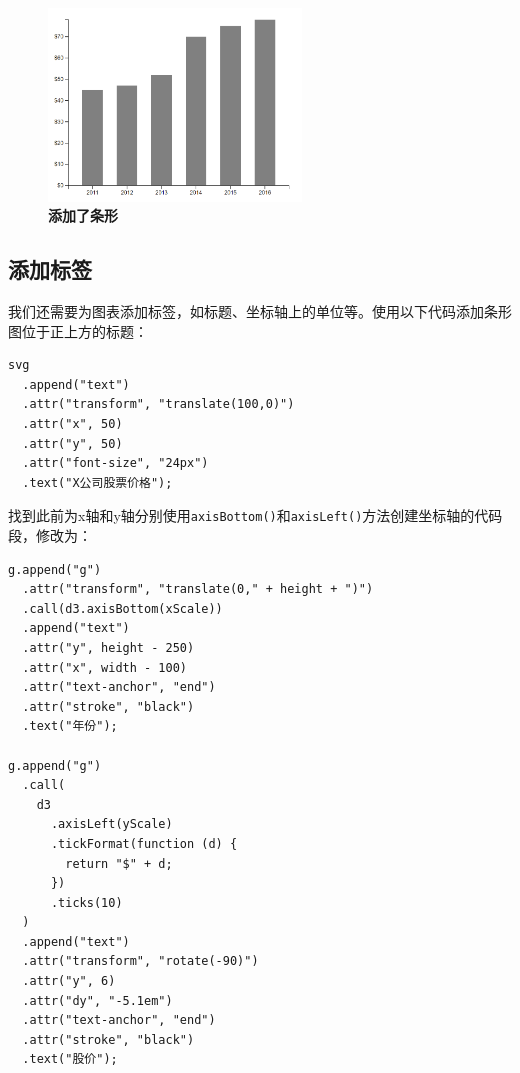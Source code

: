 \begin{figure}[htbp]
    \centering
    \includegraphics[width=0.6\textwidth]{figure/D3/company_bar.png}
    \caption{\textbf{添加了条形}}
    \label{fig:company_bar}
\end{figure}

\subsection{添加标签}

我们还需要为图表添加标签，如标题、坐标轴上的单位等。使用以下代码添加条形图位于正上方的标题：

\begin{verbatim}
svg
  .append("text")
  .attr("transform", "translate(100,0)")
  .attr("x", 50)
  .attr("y", 50)
  .attr("font-size", "24px")
  .text("X公司股票价格");
\end{verbatim}

找到此前为x轴和y轴分别使用\verb|axisBottom()|和\verb|axisLeft()|方法创建坐标轴的代码段，修改为：


\begin{verbatim}
g.append("g")
  .attr("transform", "translate(0," + height + ")")
  .call(d3.axisBottom(xScale))
  .append("text")
  .attr("y", height - 250)
  .attr("x", width - 100)
  .attr("text-anchor", "end")
  .attr("stroke", "black")
  .text("年份");

g.append("g")
  .call(
    d3
      .axisLeft(yScale)
      .tickFormat(function (d) {
        return "$" + d;
      })
      .ticks(10)
  )
  .append("text")
  .attr("transform", "rotate(-90)")
  .attr("y", 6)
  .attr("dy", "-5.1em")
  .attr("text-anchor", "end")
  .attr("stroke", "black")
  .text("股价");
\end{verbatim}

